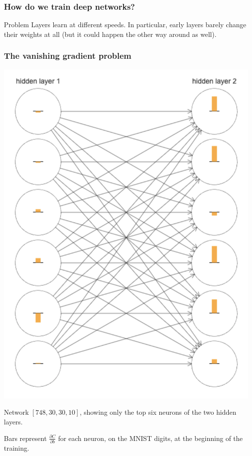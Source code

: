 \documentclass[usenames,dvipsnames]{beamer}
\begin{document}
\begin{frame}
\frametitle{How do we train deep networks?}

\begin{alertblock}{Problem}
\centering
Layers learn at different speeds. In particular, early layers barely change their weights at all (but it could happen the other way around as well).	
\end{alertblock}

\end{frame}
\begin{frame}
\frametitle{The vanishing gradient problem}

\begin{minipage}[c]{.45\textwidth}
	\centering
	\includegraphics[scale=.3]{learn-speed} 
\end{minipage} \hfill \begin{minipage}[c]{.45\textwidth}
Network $[748, 30, 30, 10]$, showing only the top six neurons of the two hidden layers.


Bars represent $\frac{\partial C}{\partial b}$ for each neuron, on the MNIST digits, at the beginning of the training.
\end{minipage}

  
\end{frame}
\end{document}
